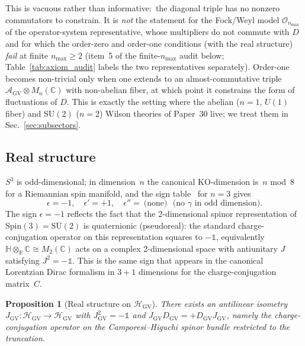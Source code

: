 \documentclass[11pt]{article}
\newtheorem{proposition}{Proposition}
\begin{document}
This is vacuous rather than informative:\ the diagonal triple has no
nonzero commutators to constrain.  It is \emph{not} the statement for
the Fock/Weyl model $\mathcal{O}_{n_{\max}}$ of the operator-system
representative, whose
multipliers do not commute with $D$ and for which the order-zero and
order-one conditions (with the real structure) \emph{fail} at finite
$n_{\max} \ge 2$ (item~5 of the finite-$n_{\max}$ audit below;
Table~\ref{tab:axiom_audit} labels the two representatives
separately).  Order-one becomes
non-trivial only when one extends to an almost-commutative triple
$\mathcal{A}_{\mathrm{GV}} \otimes M_n(\mathbb{C})$ with non-abelian
fiber, at which point it constrains the form of fluctuations of $D$.
This is exactly the setting where the abelian ($n=1$, $U(1)$ fiber) and
$\mathrm{SU}(2)$ ($n=2$) Wilson theories of Paper~30 live; we treat them in
Sec.~\ref{sec:subsectors}.

\subsection{Real structure}

$S^3$ is odd-dimensional; in dimension~$n$ the canonical
$\mathrm{KO}$-dimension is~$n$ mod~$8$ for a Riemannian spin manifold,
and the sign table~\cite{connes1995,vansuijlekom_book2015} for $n=3$
gives
\[
   \epsilon = -1, \quad \epsilon' = +1, \quad \epsilon'' = ~\text{(none)}~
   ~~\text{(no $\gamma$ in odd dimension).}
\]
The sign $\epsilon = -1$ reflects the fact that the 2-dimensional
spinor representation of $\mathrm{Spin}(3) = \mathrm{SU}(2)$ is
quaternionic (pseudoreal): the standard charge-conjugation operator
on this representation squares to $-\mathbb{1}$, equivalently
$\mathbb{H} \otimes_{\mathbb{R}} \mathbb{C} \cong M_2(\mathbb{C})$
acts on a complex 2-dimensional space with antiunitary $J$ satisfying
$J^2 = -\mathbb{1}$.  This is the same sign that appears in the
canonical Lorentzian Dirac formalism in $3+1$ dimensions for the
charge-conjugation matrix~$C$.

\begin{proposition}[Real structure on $\mathcal{H}_{\mathrm{GV}}$]
\label{prop:reality}
There exists an antilinear isometry $J_{\mathrm{GV}}:
\mathcal{H}_{\mathrm{GV}} \to \mathcal{H}_{\mathrm{GV}}$ with
$J_{\mathrm{GV}}^2 = -\mathbb{1}$ and $J_{\mathrm{GV}} D_{\mathrm{GV}}
= +D_{\mathrm{GV}} J_{\mathrm{GV}}$, namely the charge-conjugation
operator on the Camporesi--Higuchi spinor bundle restricted to the
truncation.
\end{proposition}
\end{document}
